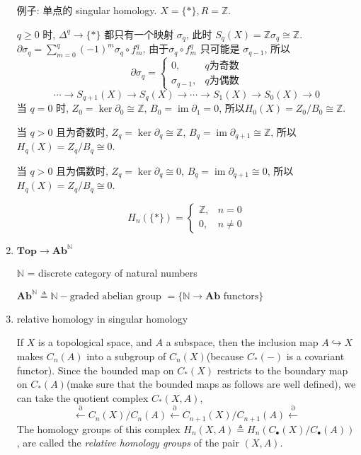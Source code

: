 \documentclass{ctexart}
\DeclareMathOperator{\im}{im}
\DeclareMathOperator{\homology}{H_\ast}
\newcommand{\Top}{\mathbf{Top}}
\newcommand{\Ab}{\mathbf{Ab}}
\begin{document}
\begin{enumerate}
例子: 单点的 singular homology. $X = \{\ast\}, R=\mathbb{Z}$.

$q\geq0$ 时, $\Delta^q \to \{\ast\}$ 都只有一个映射 $\sigma_q$, 此时 $S_q(X) = \mathbb{Z}\sigma_q \cong \mathbb{Z}$.
$\partial\sigma_q = \sum\limits_{m=0}^{q}(-1)^m\sigma_q\circ f_m^q$, 由于$\sigma_q\circ f_m^q$ 只可能是 $\sigma_{q-1}$, 所以
\[
\partial\sigma_q =
\begin{cases}
0, & q\text{为奇数}\\
\sigma_{q-1}, & q\text{为偶数}
\end{cases}
\]
\[
\cdots\to S_{q+1}(X)\to S_q(X) \to\cdots \to S_1(X)\to S_0(X)\to 0
\]
当 $q=0$ 时, $Z_0 = \ker\partial_0 \cong \mathbb{Z}$, $B_0 = \im\partial_1 = 0$, 所以$H_0(X) = Z_0/B_0 \cong \mathbb{Z}$.

当 $q > 0$ 且为奇数时, $Z_q = \ker\partial_q \cong \mathbb{Z}$, $B_q = \im\partial_{q+1} \cong \mathbb{Z}$, 所以 $H_q(X) = Z_q/B_q \cong 0$.

当 $q > 0$ 且为偶数时, $Z_q = \ker\partial_q \cong 0$, $B_q = \im\partial_{q+1} \cong 0$, 所以 $H_q(X) = Z_q/B_q \cong 0$.

\[
H_n(\{\ast\}) =
\begin{cases}
\mathbb{Z}, & n = 0\\
0, & n \neq 0
\end{cases}
\]

\item $\Top \overset{\homology}{\longrightarrow} \Ab^{\mathbb{N}}$

$\mathbb{N}$ = discrete category of natural numbers

$\Ab^{\mathbb{N}} \triangleq \mathbb{N}\!\!-\!\!\text{graded abelian group } = \{\mathbb{N} \to \Ab \text{ functors}\}$

\item relative homology in singular homology\cite{relative_homology_wiki}\cite{relative_homology_planet}

If $X$ is a topological space, and $A$ a subspace, then the inclusion map $A\hookrightarrow X$ makes $C_n(A)$ into a subgroup of $C_n(X)$(because $C_{\ast}(-)$ is a covariant functor). Since the bounded map on $C_{\ast}(X)$ restricts to the boundary map on $C_{\ast}(A)$(make sure that the bounded maps as follows are well defined), we can take the quotient complex $C_{\ast}(X,A)$,
\[
\overset{\partial}{\leftarrow} C_n(X)/C_n(A) \overset{\partial}{\leftarrow} C_{n+1}(X)/C_{n+1}(A) \overset{\partial}{\leftarrow}
\]
The homology groups of this complex $H_n⁢(X,A) \triangleq H_n(C_{\bullet}(X)/C_{\bullet}(A))$, are called the \textit{relative homology groups} of the pair $(X,A)$.


\end{enumerate}
\end{document}
